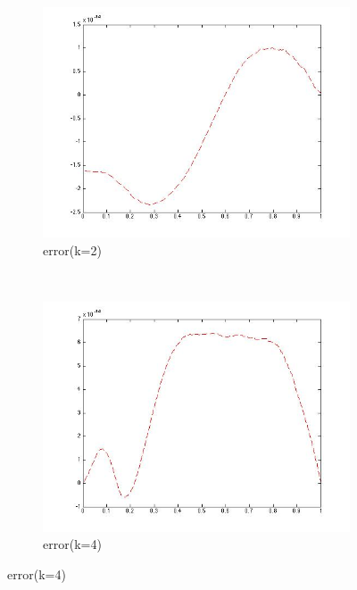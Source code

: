 \documentclass[paper=a4, fontsize=11pt]{article} %
\begin{document}
\begin{figure}
        \centering
        \begin{subfigure}[b]{0.45\textwidth}
                \includegraphics[width=\textwidth]{error2.jpg}
                \caption{error(k=2)}
                \label{fig:k2}
        \end{subfigure}%
        ~ %
        \begin{subfigure}[b]{0.45\textwidth}
                \includegraphics[width=\textwidth]{errork4.jpg}
                \caption{error(k=4)}
                \label{fig:k4}
        \end{subfigure}

\end{figure}
\end{document}
